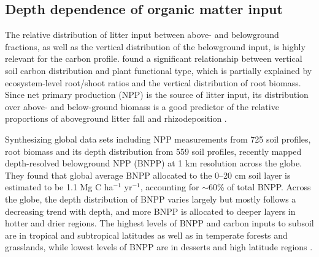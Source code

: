 \documentclass[11pt, oneside, a4paper]{article}   	%
\begin{document}
\subsection{Depth dependence of organic matter input}
The relative distribution of litter input between above- and belowground fractions,
as well as the vertical distribution of the belowground input, is highly relevant for the
carbon profile. \citet{Jobbagy2000} found a significant relationship between
vertical soil carbon distribution and plant functional type, which is partially explained by
ecosystem-level root/shoot ratios and the vertical distribution of root biomass.
Since net primary production (NPP) is the source of litter input, its distribution over above- and below-ground biomass is a good predictor of the relative proportions of aboveground litter
fall and rhizodeposition \citep{Raich1989, Xiao2023}. 

Synthesizing global data sets including NPP measurements from 725 soil profiles, root biomass and its depth distribution from 559 soil profiles, \citet{Xiao2023} recently mapped depth-resolved belowground NPP (BNPP) at 1 km resolution across the globe. They found that global average BNPP allocated to the 0–20 cm soil layer is estimated to be 1.1 Mg C ha$^{-1}$ yr$^{-1}$, accounting for $\sim$60\% of total BNPP. Across the globe, the depth distribution of BNPP varies largely but mostly follows a decreasing trend with depth, and more BNPP is allocated to deeper layers in hotter and drier regions. 
The highest levels of BNPP and carbon inputs to subsoil are in tropical and subtropical latitudes as well as in temperate forests and grasslands, while lowest levels of BNPP are in desserts and high latitude regions \citep{Xiao2023}. 
\end{document}
